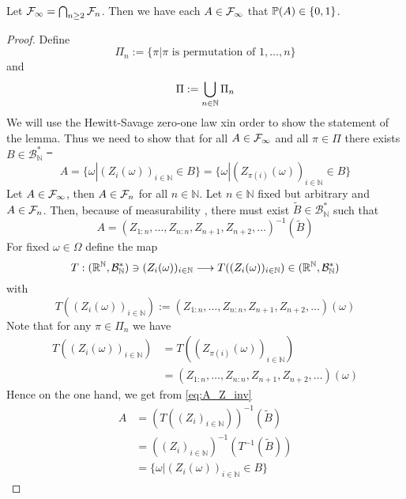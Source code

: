 \begin{lemma}
	Let $\F_\infty = \bigcap_{n\geq 2} \F_n$. Then we have each $A\in \F_\infty$ that $\P(A)\in \{0,1\}$.
	\label{lem:hewitt_savage}
	\begin{proof}
		Define 
		\begin{equation*}
		\Pi_n := \{\pi | \pi \textrm{ is permutation of } 1,\dots, n\} \nonumber
		\end{equation*}	
		and
		\begin{equation*}
		\Pi := \bigcup\limits_{n\in\mathbb{N}} \Pi_n \nonumber\\	
		\end{equation*}
		We will use the Hewitt-Savage zero-one law xin order to show the statement of the lemma. Thus we need to show that for all $A\in\F_\infty$ and all $\pi\in\Pi$ there exists $B\in\mathcal{B}_\mathbb{N}^*$ \st\ 
		\begin{equation}
		A = \{\omega| (Z_i(\omega))_{i\in\mathbb{N}} \in B\} = \{\omega| (Z_{\pi(i)}(\omega))_{i\in\mathbb{N}} \in B\}
		\label{eq:hewitt_savage}
		\end{equation} 
		Let $A\in\F_\infty$, then $A\in\F_n$ for all $n\in\mathbb{N}$. Let $n\in\mathbb{N}$ fixed but arbitrary and $A\in\F_n$. Then, because of measurability , there must exist $\tilde{B}\in\mathcal{B}_\mathbb{N}^*$ such that
		\begin{equation}
		A = (Z_{1:n}, \dots, Z_{n:n}, Z_{n+1}, Z_{n+2}, \dots)^{-1}(\tilde{B})
		\label{eq:A_Z_inv}
		\end{equation}
		For fixed $\omega\in\Omega$ define the map 
		$$T: (\R^\mathbb{N}, \mathcal{B}_\mathbb{N}^*)\ni(Z_i(\omega))_{i\in\mathbb{N}} \longrightarrow T((Z_i(\omega))_{i\in\mathbb{N}})\in (\R^\mathbb{N}, \mathcal{B}_\mathbb{N}^*)$$
		with
		$$T((Z_i(\omega))_{i\in\mathbb{N}}):=(Z_{1:n}, \dots, Z_{n:n}, Z_{n+1}, Z_{n+2}, \dots)(\omega)$$
		Note that for any $\pi\in\Pi_n$ we have 
		\begin{align}
		T((Z_i(\omega))_{i\in\mathbb{N}}) &= T((Z_{\pi(i)}(\omega))_{i\in\mathbb{N}}) \label{eq:T_permutable}\\
		&= (Z_{1:n}, \dots, Z_{n:n}, Z_{n+1}, Z_{n+2}, \dots)(\omega) \nonumber
		\end{align}
		Hence on the one hand, we get from \eqref{eq:A_Z_inv}
		\begin{align*}
		A &= (T((Z_i)_{i\in\mathbb{N}}))^{-1}(\tilde{B}) \\
		&= ((Z_i)_{i\in\mathbb{N}})^{-1}(T^{-1}(\tilde{B}))\\
		&= \{\omega | (Z_i(\omega))_{i\in\mathbb{N}} \in B\}

\end{align*}
\end{proof}
\end{lemma}
